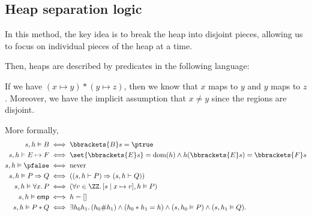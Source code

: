 \documentclass[class=scrartcl]{standalone}
\begin{document}
\subsection{Heap separation logic}
In this method, the key idea is to break the heap into disjoint pieces,
allowing us to focus on individual pieces of the heap at a time.


Then, heaps are described by predicates in the following language:

\begin{example}
  If we have \((x \mapsto y) * (y \mapsto z)\),
  then we know that \(x\) maps to \(y\) and \(y\) maps to \(z\).
  Moreover, we have the implicit assumption
  that \(x \neq y\) since the regions are disjoint.
\end{example}

More formally,
\begin{align*}
  s, h \vDash B
    &\iff \bbrackets{B}s = \ptrue \\
  s, h \vDash E \mapsto F
    &\iff \set{\bbrackets{E}s} = \operatorname{dom}(h)
            \land h(\bbrackets{E}s) = \bbrackets{F}s \\
  s, h \vDash \pfalse
    &\iff \text{never} \\
  s, h \vDash P \Rightarrow Q
    &\iff ((s, h \vdash P) \Rightarrow (s, h \vdash Q)) \\
  s, h \vDash \forall x.\, P
    &\iff (\forall v \in \ZZ.\, [s \mid x \mapsto v], h \vDash P) \\
  s, h \vDash \textsf{emp}
    &\iff h = [] \\
  s, h \vDash P * Q
    &\iff \exists h_0 h_1.\,
                    (h_0 \# h_1)
                      \land (h_0 * h_1 = h)
                      \land (s, h_0 \vDash P)
                      \land (s, h_1 \vDash Q).
\end{align*}
\end{document}
